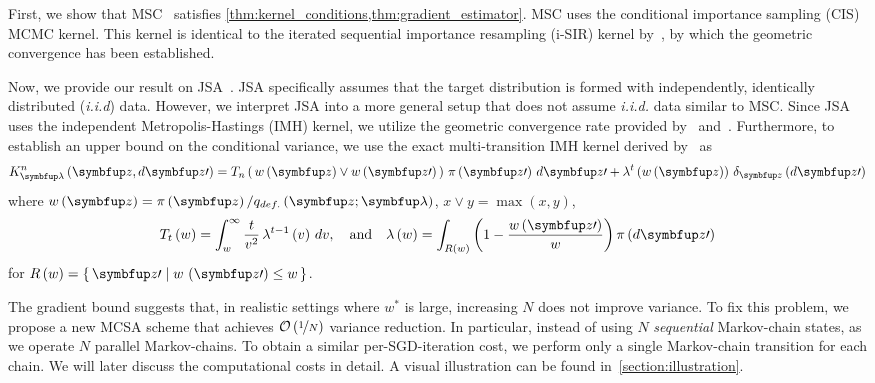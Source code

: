 

First, we show that MSC~\citep{NEURIPS2020_b2070693} satisfies \cref{thm:kernel_conditions,thm:gradient_estimator}.
MSC uses the conditional importance sampling (CIS) MCMC kernel.
This kernel is identical to the iterated sequential importance resampling (i-SIR) kernel by~\citet{andrieu_uniform_2018}, by which the geometric convergence has been established.




Now, we provide our result on JSA~\citep{pmlr-v124-ou20a}.
JSA specifically assumes that the target distribution is formed with independently, identically distributed (\textit{i.i.d}) data.
However, we interpret JSA into a more general setup that does not assume \textit{i.i.d.} data similar to MSC.
Since JSA~\citep{pmlr-v124-ou20a} uses the independent Metropolis-Hastings (IMH) kernel, we utilize the geometric convergence rate provided by~\citet[Theorem 2.1]{10.2307/2242610} and~\citet{wang_exact_2020}.
Furthermore, to establish an upper bound on the conditional variance, we use the exact multi-transition IMH kernel derived by~\cite{Smith96exacttransition} as
{%
  \begin{align}
  K^n_{\vlambda}\left(\vz, d\vz\prime\right) 
  = T_n\left(\, w\left(\vz\right) \vee w\left(\vz\prime\right)\,\right) \, \pi\left(\vz\prime\right) \, d\vz\prime
  + \lambda^t\left(w\left(\vz\right)\right) \, \delta_{\vz}\left(d\vz\prime\right)
  \label{eq:imh_exact_kernel}
  \end{align}
}%
where {\(w\left(\vz\right) = \pi\left(\vz\right)/q_{def.}\left(\vz; \vlambda\right)\), \(x \vee y = \max\left(x, y\right)\)},
{%
  \begin{align}
    T_t\left(w\right)      = \int_w^{\infty} \frac{t}{v^2} \, \lambda^{t-1}\left(v\right)\,dv,
    \quad\text{and}\quad
    \lambda\left(w\right) = \int_{R\left(w\right)} \left( 1 - \frac{w\left(\vz\prime\right)}{w}  \right) \pi\left(d\vz\prime\right)\label{eq:T_lambda}
  \end{align}
}
for {\(R\left(w\right) = \{\, \vz\prime \mid w\,\left(\vz\prime\right) \leq w \,\}\)}.
%


%
The gradient bound suggests that, in realistic settings where \(w^*\) is large, increasing \(N\) does not improve variance.
To fix this problem, we propose a new MCSA scheme that achieves \(\mathcal{O}\left(\nicefrac{1}{N}\right)\) variance reduction.
In particular, instead of using \(N\) \textit{sequential} Markov-chain states, as we operate \(N\) parallel Markov-chains.
To obtain a similar per-SGD-iteration cost, we perform only a single Markov-chain transition for each chain.
We will later discuss the computational costs in detail.
A visual illustration can be found in~\cref{section:illustration}.

